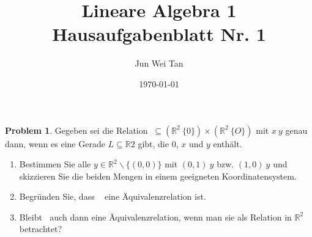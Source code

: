 \documentclass[prb,12pt]{revtex4-2}
\theoremstyle{definition}
\newtheorem{Problem}{Problem}
\theoremstyle{definition}
\newenvironment{parts}{\begin{enumerate}[label=(\alph*)]}{\end{enumerate}}
\newcommand{\R}{\mathbb{R}}
\begin{document}
	\title{Lineare Algebra 1 Hausaufgabenblatt Nr. 1}
	\author{Jun Wei Tan}
	\date{\today}
	\maketitle
\begin{Problem}
	Gegeben sei die Relation $~\subseteq (\R^2 \ \{0\}) \times  (\R^2 \ \{O\})$ mit $x ~ y$ genau dann, wenn es eine Gerade $L \subseteq \R2$ gibt, die $0$, $x$ und $y$ enthält.

	\begin{parts}
		\item Bestimmen Sie alle $y \in \R^2 \backslash \{(0, 0)\}$ mit $(0, 1) ~ y$ bzw. $(1, 0) ~ y$ und skizzieren Sie die beiden Mengen in einem geeigneten Koordinatensystem.
		\item Begründen Sie, dass ~ eine Äquivalenzrelation ist.
		\item Bleibt $~$ auch dann eine Äquivalenzrelation, wenn man sie als Relation in $\R^2$ betrachtet?
	\end{parts}
\end{Problem}
\end{document}
